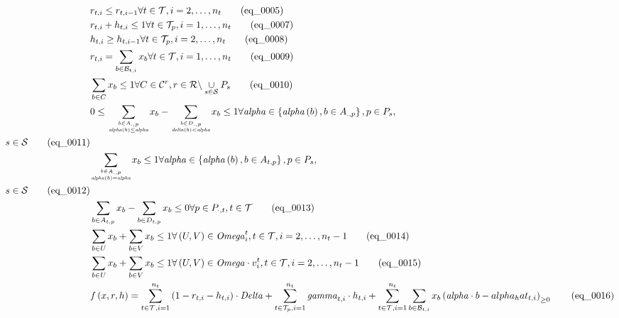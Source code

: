 \begin{align}
  & r_{t , i} \leq r_{t , i - 1} \forall t \in \mathcal{T} , i = 2 , \ldots , n_{t} \tag{eq\_0005} \\
  & r_{t , i} + h_{t , i} \leq 1 \forall t \in \mathcal{T}_{p} , i = 1 , \ldots , n_{t} \tag{eq\_0007} \\
  & h_{t , i} \geq h_{t , i - 1} \forall t \in \mathcal{T}_{p} , i = 2 , \ldots , n_{t} \tag{eq\_0008} \\
  & r_{t , i} = \sum_{b \in \mathcal{B}_{t , i}} x_{b} \forall t \in \mathcal{T} , i = 1 , \ldots , n_{t} \tag{eq\_0009} \\
  & \sum_{b \in C} x_{b} \leq 1 \forall C \in \mathcal{C}^{r} , r \in \mathcal{R} \backslash \underset{s \in \mathcal{S}}{\cup} P_{s} \tag{eq\_0010} \\
  & 0 \leq \underset{\genfrac{}{}{0pt}{}{b \in A_{. , p}}{\mathit{alpha} \left(b\right) \leq \mathit{alpha}}}{\sum} x_{b} - \underset{\genfrac{}{}{0pt}{}{b \in D_{. , p}}{\mathit{delta} \left(b\right) < \mathit{alpha}}}{\sum} x_{b} \leq 1 \forall \mathit{alpha} \in \left\{\mathit{alpha} \left(b\right) , b \in A_{. , p}\right\} , p \in P_{s} , \\ s \in \mathcal{S}  \tag{eq\_0011} \\
  & \underset{\genfrac{}{}{0pt}{}{b \in A_{. , p}}{\mathit{alpha} \left(b\right) = \mathit{alpha}}}{\sum} x_{b} \leq 1 \forall \mathit{alpha} \in \left\{\mathit{alpha} \left(b\right) , b \in A_{t , p}\right\} , p \in P_{s} , \\ s \in \mathcal{S}  \tag{eq\_0012} \\
  & \sum_{b \in A_{t , p}} x_{b} - \sum_{b \in D_{t , p}} x_{b} \leq 0 \forall p \in P_{\cdot , t} , t \in \mathcal{T} \tag{eq\_0013} \\
  & \sum_{b \in U} x_{b} + \sum_{b \in V} x_{b} \leq 1 \forall \left(U , V\right) \in \mathit{Omega}_{i}^{t} , t \in \mathcal{T} , i = 2 , \ldots , n_{t} - 1 \tag{eq\_0014} \\
  & \sum_{b \in U} x_{b} + \sum_{b \in V} x_{b} \leq 1 \forall \left(U , V\right) \in \mathit{Omega} \cdot v_{i}^{t} , t \in \mathcal{T} , i = 2 , \ldots , n_{t} - 1 \tag{eq\_0015} \\
  & f \left(x , r , h\right) = \sum_{t \in \mathcal{T}, i = 1} ^{n_{t}} \left(1 - r_{t , i} - h_{t , i}\right) \cdot \mathit{Delta} + \sum_{t \in \mathcal{T}_{p}, i = 1} ^{n_{t}} \mathit{gamma}_{t , i} \cdot h_{t , i} + \sum_{t \in \mathcal{T}, i = 1} ^{n_{t}} \sum_{b \in \mathcal{B}_{t , i}} x_{b} \left(\mathit{alpha} \cdot b - alpha_hat_{t , i}\right)_{\geq 0} \tag{eq\_0016} \\

\end{align}
